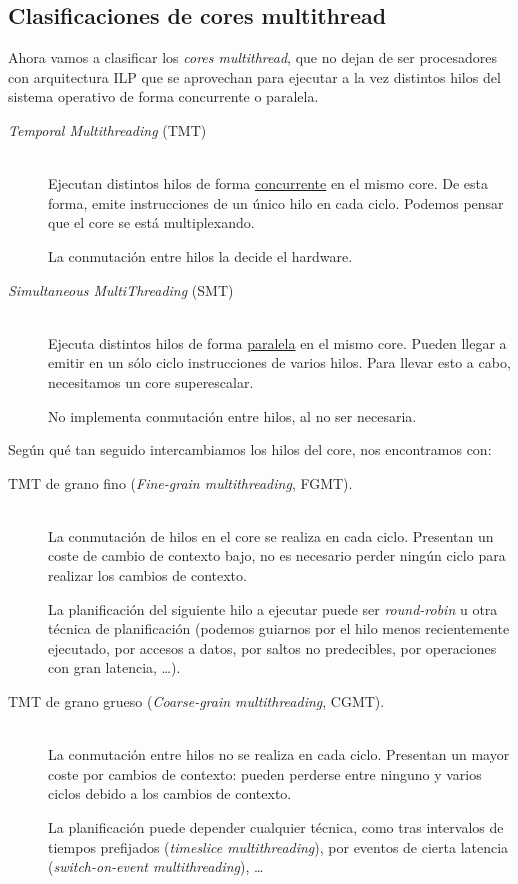 \subsection{Clasificaciones de cores multithread}
Ahora vamos a clasificar los \emph{cores multithread}, que no dejan de ser procesadores con arquitectura ILP que se aprovechan para ejecutar a la vez distintos hilos del sistema operativo de forma concurrente o paralela.
\begin{description}
    \item [\emph{Temporal Multithreading} (TMT)]~\\ Ejecutan distintos hilos de forma \underline{concurrente} en el mismo core. De esta forma, emite instrucciones de un único hilo en cada ciclo. Podemos pensar que el core se está multiplexando.

        La conmutación entre hilos la decide el hardware.
    \item [\emph{Simultaneous MultiThreading} (SMT)]~\\ Ejecuta distintos hilos de forma \underline{paralela} en el mismo core. Pueden llegar a emitir en un sólo ciclo instrucciones de varios hilos. Para llevar esto a cabo, necesitamos un core superescalar.

        No implementa conmutación entre hilos, al no ser necesaria.
\end{description}
Según qué tan seguido intercambiamos los hilos del core, nos encontramos con:
\begin{description}
    \item [TMT de grano fino (\emph{Fine-grain multithreading}, FGMT).]~\\ La conmutación de hilos en el core se realiza en cada ciclo. Presentan un coste de cambio de contexto bajo, no es necesario perder ningún ciclo para realizar los cambios de contexto.

        La planificación del siguiente hilo a ejecutar puede ser \emph{round-robin} u otra técnica de planificación (podemos guiarnos por el hilo menos recientemente ejecutado, por accesos a datos, por saltos no predecibles, por operaciones con gran latencia, \ldots).
    \item [TMT de grano grueso (\emph{Coarse-grain multithreading}, CGMT).]~\\ La conmutación entre hilos no se realiza en cada ciclo. Presentan un mayor coste por cambios de contexto: pueden perderse entre ninguno y varios ciclos debido a los cambios de contexto.

        La planificación puede depender cualquier técnica, como tras intervalos de tiempos prefijados (\emph{timeslice multithreading}), por eventos de cierta latencia (\emph{switch-on-event multithreading}), \ldots
\end{description}

